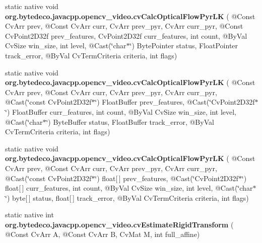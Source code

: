 \begin{DoxyCompactItemize}
\item 
\mbox{\label{group__video__c_gaa39267726b5394df33baff75e82f2984}} 
static native void {\bfseries org.\+bytedeco.\+javacpp.\+opencv\+\_\+video.\+cv\+Calc\+Optical\+Flow\+Pyr\+LK} ( @Const Cv\+Arr prev, @Const Cv\+Arr curr, Cv\+Arr prev\+\_\+pyr, Cv\+Arr curr\+\_\+pyr, @Const Cv\+Point2\+D32f prev\+\_\+features, Cv\+Point2\+D32f curr\+\_\+features, int count, @By\+Val Cv\+Size win\+\_\+size, int level, @Cast(\char`\"{}char$\ast$\char`\"{}) Byte\+Pointer status, Float\+Pointer track\+\_\+error, @By\+Val Cv\+Term\+Criteria criteria, int flags)
\item 
\mbox{\label{group__video__c_gaa851ae1aa9bcfb53906e79335bf37021}} 
static native void {\bfseries org.\+bytedeco.\+javacpp.\+opencv\+\_\+video.\+cv\+Calc\+Optical\+Flow\+Pyr\+LK} ( @Const Cv\+Arr prev, @Const Cv\+Arr curr, Cv\+Arr prev\+\_\+pyr, Cv\+Arr curr\+\_\+pyr, @Cast(\char`\"{}const Cv\+Point2\+D32f$\ast$\char`\"{}) Float\+Buffer prev\+\_\+features, @Cast(\char`\"{}Cv\+Point2\+D32f$\ast$\char`\"{}) Float\+Buffer curr\+\_\+features, int count, @By\+Val Cv\+Size win\+\_\+size, int level, @Cast(\char`\"{}char$\ast$\char`\"{}) Byte\+Buffer status, Float\+Buffer track\+\_\+error, @By\+Val Cv\+Term\+Criteria criteria, int flags)
\item 
\mbox{\label{group__video__c_ga381b31cffcfca0752c8fe8acf1b13929}} 
static native void {\bfseries org.\+bytedeco.\+javacpp.\+opencv\+\_\+video.\+cv\+Calc\+Optical\+Flow\+Pyr\+LK} ( @Const Cv\+Arr prev, @Const Cv\+Arr curr, Cv\+Arr prev\+\_\+pyr, Cv\+Arr curr\+\_\+pyr, @Cast(\char`\"{}const Cv\+Point2\+D32f$\ast$\char`\"{}) float\mbox{[}$\,$\mbox{]} prev\+\_\+features, @Cast(\char`\"{}Cv\+Point2\+D32f$\ast$\char`\"{}) float\mbox{[}$\,$\mbox{]} curr\+\_\+features, int count, @By\+Val Cv\+Size win\+\_\+size, int level, @Cast(\char`\"{}char$\ast$\char`\"{}) byte\mbox{[}$\,$\mbox{]} status, float\mbox{[}$\,$\mbox{]} track\+\_\+error, @By\+Val Cv\+Term\+Criteria criteria, int flags)
\item 
\mbox{\label{group__video__c_gaf77e24df6d32d8c52f33e1ad9a11e4f8}} 
static native int {\bfseries org.\+bytedeco.\+javacpp.\+opencv\+\_\+video.\+cv\+Estimate\+Rigid\+Transform} ( @Const Cv\+Arr A, @Const Cv\+Arr B, Cv\+Mat M, int full\+\_\+affine)

\end{DoxyCompactItemize}
